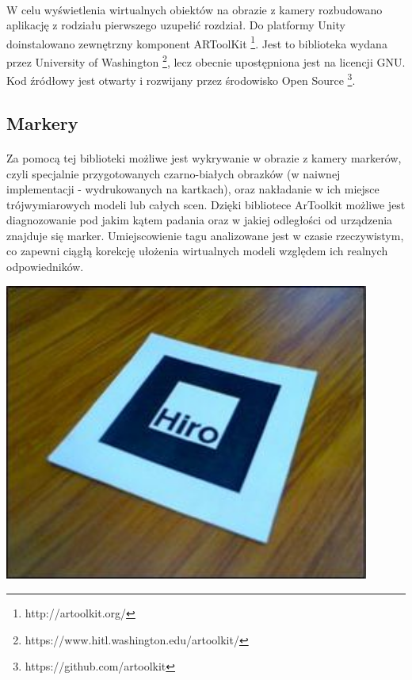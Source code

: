 \documentclass[12pt]{article}
\begin{document}
{{\paragraph{}
W celu wyświetlenia wirtualnych obiektów na obrazie z kamery rozbudowano aplikację z rodziału pierwszego {\color{red}uzupełić rozdział}. Do platformy Unity doinstalowano zewnętrzny komponent ARToolKit  \footnote{http://artoolkit.org/}. Jest to biblioteka wydana przez University of Washington \footnote{https://www.hitl.washington.edu/artoolkit/}, lecz obecnie upostępniona jest na licencji GNU. Kod źródłowy jest otwarty i rozwijany przez środowisko Open Source \footnote{https://github.com/artoolkit}.
\subsection{Markery}
\paragraph{}
Za pomocą tej biblioteki możliwe jest wykrywanie w obrazie z kamery markerów, czyli specjalnie przygotowanych czarno-białych obrazków (w naiwnej implementacji - wydrukowanych na kartkach), oraz nakładanie w ich miejsce trójwymiarowych modeli lub całych scen. Dzięki bibliotece ArToolkit możliwe jest diagnozowanie pod jakim kątem padania oraz w jakiej odległości od urządzenia znajduje się marker. Umiejscowienie tagu analizowane jest w czasie rzeczywistym, co zapewni ciągłą korekcję ułożenia wirtualnych modeli względem ich realnych odpowiedników.

\begin{center}
\includegraphics[width=0.9\textwidth]{images/hiro.png}


\end{center}}}
\end{document}
